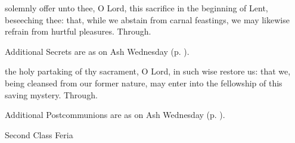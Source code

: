 \secret
{} solemnly offer unto thee, O Lord, this sacrifice in the beginning of Lent, beseeching thee: that, while we abstain from carnal feastings, we may likewise refrain from hurtful pleasures. Through.
\begin{rubric}
    Additional Secrets are as on Ash Wednesday (p. \pageref{AshWednesdayMass}).
\end{rubric}
\postcommunion
{} the holy partaking of thy sacrament, O Lord, in such wise restore us: that we, being cleansed from our former nature, may enter into the fellowship of this saving mystery. Through.
\begin{rubric}
    Additional Postcommunions are as on Ash Wednesday (p. \pageref{AshWednesdayMass}).
\end{rubric}

\begin{inhead}
{Second Class Feria}
\end{inhead}
\par\noindent
{}


